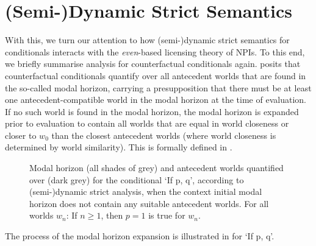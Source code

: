 \section{(Semi-)Dynamic Strict Semantics}
With this, we turn our attention to how  (semi-)dynamic strict semantics for conditionals interacts with the \textit{even}-based licensing theory of NPIs. To this end, we briefly summarise  analysis for counterfactual conditionals again. \textcite{Fintel2001} posits that counterfactual conditionals quantify over all antecedent worlds that are found in the so-called modal horizon, carrying a presupposition that there must be at least one antecedent-compatible world in the modal horizon at the time of evaluation. If no such world is found in the modal horizon, the modal horizon is expanded prior to evaluation to contain all worlds that are equal in world closeness or closer to $w_0$ than the closest antecedent worlds (where world closeness is determined by world similarity). This is formally defined in .
\pex{}\xe
\begin{figure}[!htb]
\resizebox{\textwidth}{!}{}
\caption{Modal horizon (all shades of grey) and antecedent worlds quantified over (dark grey) for the conditional `If p, q', according to  (semi-)dynamic strict analysis, when the context initial modal horizon does not contain any suitable antecedent worlds. For all worlds $w_n$: If $n\geqslant1$, then $p=1$ is true for $w_n$.}
\end{figure}
The process of the modal horizon expansion is illustrated in  for `If p, q'.

